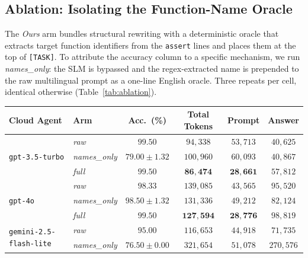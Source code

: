 \documentclass[11pt,a4paper,twocolumn]{article}
\begin{document}
\subsection{Ablation: Isolating the Function-Name Oracle}
\label{sec:ablation}
The \textit{Ours} arm bundles structural rewriting with a deterministic oracle that extracts target function identifiers from the \texttt{assert} lines and places them at the top of \texttt{[TASK]}. To attribute the accuracy column to a specific mechanism, we run \textit{names\_only}: the SLM is bypassed and the regex-extracted name is prepended to the raw multilingual prompt as a one-line English oracle. Three repeats per cell, identical otherwise (Table~\ref{tab:ablation}).

\begin{table}[t]
\centering
\small
\setlength{\tabcolsep}{4pt}
\begin{tabular}{llcccc}
\toprule
\textbf{Cloud Agent} & \textbf{Arm} & \textbf{Acc.\ (\%)} & \textbf{Total Tokens} & \textbf{Prompt} & \textbf{Answer} \\
\midrule
\multirow{3}{*}{\texttt{gpt-3.5-turbo}}        & \textit{raw}         & $99.50$           & $94{,}338$           & $53{,}713$           & $40{,}625$ \\
                                               & \textit{names\_only} & $79.00 \pm 1.32$  & $100{,}960$          & $60{,}093$           & $40{,}867$ \\
                                               & \textit{full}        & $\mathbf{99.50}$  & $\mathbf{86{,}474}$  & $\mathbf{28{,}661}$  & $57{,}812$ \\
\midrule
\multirow{3}{*}{\texttt{gpt-4o}}               & \textit{raw}         & $98.33$           & $139{,}085$          & $43{,}565$           & $95{,}520$ \\
                                               & \textit{names\_only} & $98.50 \pm 1.32$  & $131{,}336$          & $49{,}212$           & $82{,}124$ \\
                                               & \textit{full}        & $\mathbf{99.50}$  & $\mathbf{127{,}594}$ & $\mathbf{28{,}776}$  & $98{,}819$ \\
\midrule
\multirow{3}{*}{\texttt{gemini-2.5-flash-lite}}& \textit{raw}         & $95.00$           & $116{,}653$          & $44{,}918$           & $71{,}735$ \\
                                               & \textit{names\_only} & $76.50 \pm 0.00$  & $321{,}654$          & $51{,}078$           & $\mathit{270{,}576}$ \\

\end{tabular}
\end{table}
\end{document}
